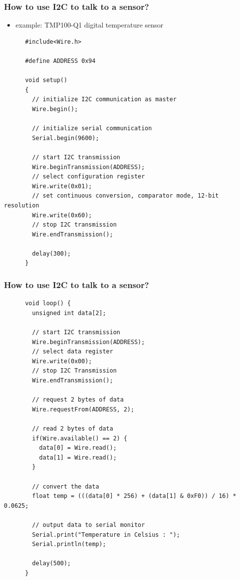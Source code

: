 \documentclass{beamer}
\begin{document}
\begin{frame}[fragile]
  \frametitle{How to use I2C to talk to a sensor?}
  \begin{itemize}
    \item example: TMP100-Q1 digital temperature sensor
  \end{itemize}
  {
    \tiny
    \begin{verbatim}
      #include<Wire.h>

      #define ADDRESS 0x94

      void setup() 
      {
        // initialize I2C communication as master
        Wire.begin();
        
        // initialize serial communication
        Serial.begin(9600);

        // start I2C transmission
        Wire.beginTransmission(ADDRESS);
        // select configuration register
        Wire.write(0x01);
        // set continuous conversion, comparator mode, 12-bit resolution
        Wire.write(0x60);
        // stop I2C transmission
        Wire.endTransmission();
        
        delay(300);  
      }
    \end{verbatim}
  }
\end{frame}


\begin{frame}[fragile]
  \frametitle{How to use I2C to talk to a sensor?}
  {
    \tiny
    \begin{verbatim}
      void loop() {
        unsigned int data[2];
        
        // start I2C transmission
        Wire.beginTransmission(ADDRESS);
        // select data register
        Wire.write(0x00);
        // stop I2C Transmission
        Wire.endTransmission();

        // request 2 bytes of data
        Wire.requestFrom(ADDRESS, 2);

        // read 2 bytes of data
        if(Wire.available() == 2) {
          data[0] = Wire.read();
          data[1] = Wire.read();
        }
          
        // convert the data
        float temp = (((data[0] * 256) + (data[1] & 0xF0)) / 16) * 0.0625;
        
        // output data to serial monitor
        Serial.print("Temperature in Celsius : ");
        Serial.println(temp);
        
        delay(500);
      }
    \end{verbatim}
  }
\end{frame}
\end{document}
